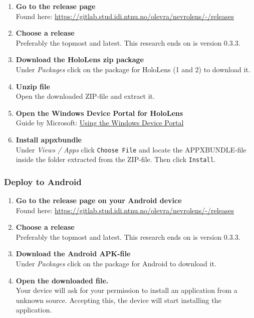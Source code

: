 \begin{enumerate}
    \item {
        \textbf{Go to the release page}\\
        Found here: \url{https://gitlab.stud.idi.ntnu.no/olevra/nevrolens/-/releases}
    }
    \item {
        \textbf{Choose a release}\\
        Preferably the topmost and latest. This research ends on is version 0.3.3. 
    }

    \item {
        \textbf{Download the HoloLens zip package}\\
        Under \textit{Packages} click on the package for HoloLens (1 and 2) to download it.
    }

    \item {
        \textbf{Unzip file}\\
        Open the downloaded ZIP-file and extract it.
    }

    \item {
        \textbf{Open the Windows Device Portal for HoloLens}\\
        Guide by Microsoft: \href{https://docs.microsoft.com/en-us/windows/mixed-reality/develop/platform-capabilities-and-apis/using-the-windows-device-portal}{Using the Windows Device Portal}
    }
    \item {
        \textbf{Install appxbundle}\\
        Under \textit{Views / Apps} click \texttt{Choose File} and locate the APPXBUNDLE-file inside the folder extracted from the ZIP-file. Then click \texttt{Install}.
    }

\end{enumerate}

\subsubsection*{Deploy to Android}

\begin{enumerate}
    \item {
        \textbf{Go to the release page on your Android device}\\
        Found here: \url{https://gitlab.stud.idi.ntnu.no/olevra/nevrolens/-/releases}
    }
    \item {
        \textbf{Choose a release}\\
        Preferably the topmost and latest. This research ends on is version 0.3.3. 
    }

    \item {
        \textbf{Download the Android APK-file}\\
        Under \textit{Packages} click on the package for Android to download it.
    }

    \item {
        \textbf{Open the downloaded file.}\\
        Your device will ask for your permission to install an application from a unknown source. Accepting this, the device will start installing the application.
    }

\end{enumerate}

